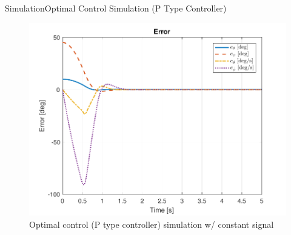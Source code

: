 \documentclass{beamer}
\begin{document}
\begin{frame}{Simulation}{Optimal Control Simulation (P Type Controller)}
    \begin{figure}
      \centering 
      \includegraphics[scale=0.5]{figs/MATLAB/LQR/P_Simulation/LQR_Error_Con}
      \caption{Optimal control (P type controller) simulation w/ constant signal}
      \label{fig:LQR_Error_Con}
    \end{figure}
\end{frame}

\end{document}

